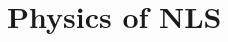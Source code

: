 \newcommand{\Rom}{R_\omega(\bar{x})}
\newcommand{\eiwz}{e^{i\omega z}}

\newcommand{\eikzwt}{e^{i(k_0z-\omega_0t)}}

\newcommand{\ec}{\mathcal{E}}
\newcommand{\ev}{\vv{\mathcal{E}}}
\newcommand{\dc}{\mathcal{D}}
\newcommand{\dv}{\vv{\mathcal{D}}}

\newcommand{\bv}{\vv{\mathcal{B}}}
\newcommand{\hv}{\vv{\mathcal{H}}}

\newcommand{\pc}{\mathcal{P}}
\newcommand{\pl}{\pc_\text{lin}}
\newcommand{\pn}{\pc_\text{nl}}
\newcommand{\pv}{\vv{\mathcal{P}}}

\newcommand{\ca}{\chi^{\text{(1)}}}
\newcommand{\cc}{\chi^{\text{(3)}}}
\newcommand{\ww}{\omega_0}
\newcommand{\kp}{k_\perp}
\newcommand{\overeq}[1]{\overset{\eqref{#1}}{=}}
\newcommand{\bigo}[1]{\mathcal{O}\left(#1\right)}

\setlength\multicolsep{0pt}

\chapter{Physics of NLS}
\label{physics}



